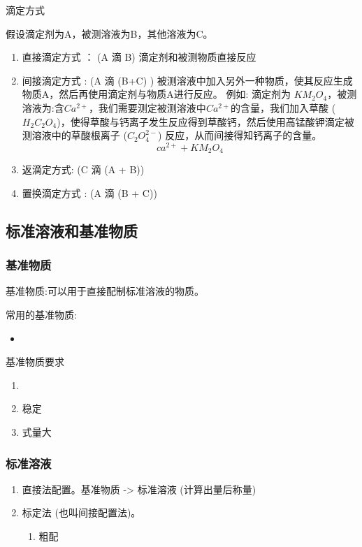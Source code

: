 滴定方式 

假设滴定剂为A，被测溶液为B，其他溶液为C。
\begin{enumerate}
	\item 直接滴定方式 ： (A 滴 B) 滴定剂和被测物质直接反应
	\item 间接滴定方式 : (A 滴 (B+C) ) 被测溶液中加入另外一种物质，使其反应生成物质A，然后再使用滴定剂与物质A进行反应。 
	例如: 滴定剂为 $KM_2O_4$，被测溶液为:含$Ca^{2+}$，我们需要测定被测溶液中$Ca^{2+}$的含量，我们加入草酸 ($H_2C_2O_4$)，使得草酸与钙离子发生反应得到草酸钙，然后使用高锰酸钾滴定被测溶液中的草酸根离子 ($C_2O_4^{2-}$) 反应，从而间接得知钙离子的含量。
	\begin{equation}
		ca^{2+} + KM_2O_4 
	\end{equation}

	\item 返滴定方式: (C 滴 (A + B))
	\item 置换滴定方式 : (A 滴 (B + C))
	
\end{enumerate}

\subsection{标准溶液和基准物质}

\subsubsection{基准物质}
基准物质:可以用于直接配制标准溶液的物质。

常用的基准物质:
\begin{itemize}
	\item 
	
\end{itemize}

基准物质要求
\begin{enumerate}
	\item 
	\item 稳定
	\item 式量大
	
\end{enumerate}


\subsubsection{标准溶液}

\begin{enumerate}
	\item 直接法配置。基准物质 -> 标准溶液 (计算出量后称量)
	\item 标定法 (也叫间接配置法)。 
	\begin{enumerate}
		\item 粗配

		
	\end{enumerate}
	
\end{enumerate}

